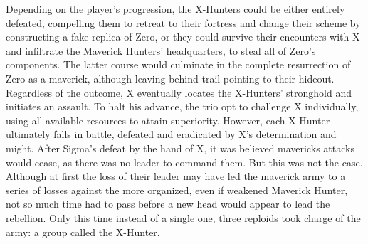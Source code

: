 Depending on the player's progression, the X-Hunters could be either entirely defeated, compelling them to retreat to their fortress and change their scheme by constructing a fake replica of Zero, or they could survive their encounters with X and infiltrate the Maverick Hunters' headquarters, to steal all of Zero's components. The latter course would culminate in the complete resurrection of Zero as a maverick, although leaving behind trail pointing to their hideout. Regardless of the outcome, X eventually locates the X-Hunters' stronghold and initiates an assault. To halt his advance, the trio opt to challenge X individually, using all available resources to attain superiority. However, each X-Hunter ultimately falls in battle, defeated and eradicated by X's determination and might.
After Sigma's defeat by the hand of X, it was believed mavericks attacks would cease, as there was no leader to command them. But this was not the case. Although at first the loss of their leader may have led the maverick army to a series of losses against the more organized, even if weakened Maverick Hunter, not so much time had to pass before a new head would appear to lead the rebellion. Only this time instead of a single one, three reploids took charge of the army: a group called the X-Hunter.


